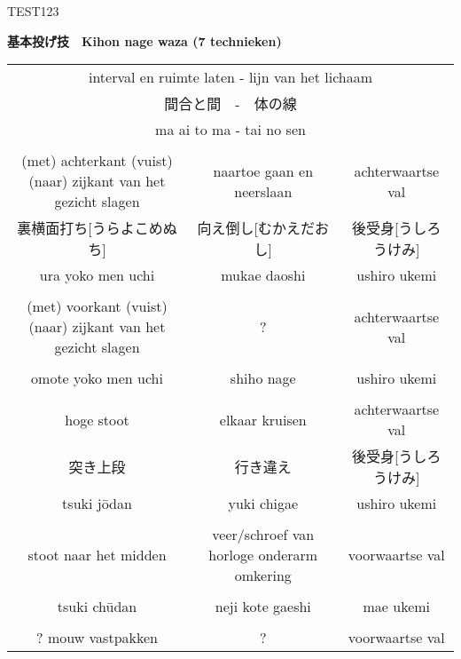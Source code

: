 \documentclass[a4paper,12pt]{article}
\begin{document}
\begin{CJK}{UTF8}{min}
\CJKtilde
\begin{landscape}
\thispagestyle{empty} %
TEST123


\begin{center}
    \textbf{基本投げ技　Kihon nage waza (7 technieken)}
\end{center}
\begin{table}[H]
\begin{center}
\scriptsize
\begin{tabular}{ccc}
\multicolumn{3}{c}{interval en ruimte laten - lijn van het lichaam}\\
\multicolumn{3}{c}{間合と間　-　体の線}\\
\multicolumn{3}{c}{ma ai to ma - tai no sen}\\
\\
(met) achterkant (vuist) (naar) zijkant van het gezicht slagen & naartoe gaan en neerslaan & achterwaartse val\\
裏横面打ち[うらよこめぬち] & 向え倒し[むかえだおし] & 後受身[うしろうけみ]\\
ura yoko men uchi & mukae daoshi & ushiro ukemi\\
\\
(met) voorkant (vuist) (naar) zijkant van het gezicht slagen & ? & achterwaartse val\\
\\
omote yoko men uchi & shiho nage & ushiro ukemi\\
\\
hoge stoot & elkaar kruisen & achterwaartse val\\
突き上段 & 行き違え & 後受身[うしろうけみ]\\
tsuki j\={o}dan & yuki chigae & ushiro ukemi\\
\\
stoot naar het midden & veer/schroef van horloge onderarm omkering & voorwaartse val\\
\\
tsuki ch\={u}dan & neji kote gaeshi & mae ukemi\\
\\
? mouw vastpakken & ? & voorwaartse val\\

\end{tabular}
\end{center}
\end{table}
\end{landscape}
\end{CJK}
\end{document}
